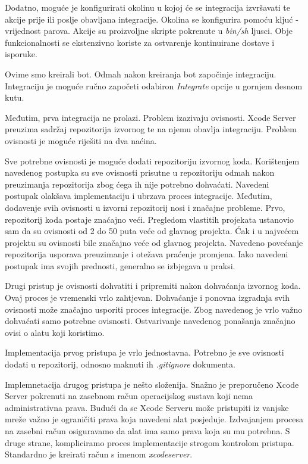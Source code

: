 \documentclass[times, utf8, diplomski, numeric]{fer}
\begin{document}
\begin{appendices}
Dodatno, moguće je konfigurirati okolinu u kojoj će se integracija izvršavati te akcije prije ili poslje obavljana integracije. Okolina se konfigurira pomoću kljuć - vrijednost parova. Akcije su proizvoljne skripte pokrenute u \textit{bin/sh} ljusci. Obje funkcionalnosti se ekstenzivno koriste za ostvarenje kontinuirane dostave i isporuke.

Ovime smo kreirali bot. Odmah nakon kreiranja bot započinje integraciju. Integraciju je moguće ručno započeti odabiron \textit{Integrate} opcije u gornjem desnom kutu.

Međutim, prva integracija ne prolazi. Problem izazivaju ovisnosti. Xcode Server preuzima sadržaj repozitorija izvornog te na njemu obavlja integraciju. Problem ovisnosti je moguće riješiti na dva naćina.

Sve potrebne ovisnosti je moguće dodati repozitoriju izvornog koda. Korištenjem navedenog postupka su sve ovisnosti prisutne u repozitoriju odmah nakon preuzimanja repozitorija zbog ćega ih nije potrebno dohvaćati. Navedeni postupak olakšava implementaciju i ubrzava proces integracije. Međutim, dodavenje svih ovisnosti u izvorni repozitorij nosi i značajne probleme. Prvo, repozitorij koda postaje znaćajno veći. Pregledom vlastitih projekata ustanovio sam da su ovisnosti od 2 do 50 puta veće od glavnog projekta. Ćak i u najvećem projektu su ovisnosti bile značajno veće od glavnog projekta. Navedeno povećanje repozitorija usporava preuzimanje i otežava praćenje promjena. Iako navedeni postupak ima svojih prednosti, generalno se izbjegava u praksi.

Drugi pristup je ovisnosti dohvatiti i pripremiti nakon dohvaćanja izvornog koda. Ovaj proces je vremenski vrlo zahtjevan. Dohvaćanje i ponovna izgradnja svih ovisnosti može značajno usporiti proces integracije. Zbog navedenog je vrlo važno dohvaćati samo potrebne ovisnosti. Ostvarivanje navedenog ponašanja značajno ovisi o alatu koji koristimo.

Implementacija prvog pristupa je vrlo jednostavna. Potrebno je sve ovisnosti dodati u repozitorij, odnosno maknuti ih \textit{.gitignore} dokumenta.

Implemnetacija drugog pristupa je nešto složenija. Snažno je preporučeno Xcode Server pokrenuti na zasebnom račun operacijskog sustava koji nema administrativna prava. Budući da se Xcode Serveru može pristupiti iz vanjske mreže važno je ograničiti prava koja navedeni alat posjeduje. Izdvajanjem procesa na zasebni račun osiguravamo da alat ima samo prava koja su mu potrebna. S druge strane, kompliciramo proces implementacije strogom kontrolom pristupa. Standardno je kreirati račun s imenom \textit{xcodeserver}.


\end{appendices}
\end{document}
